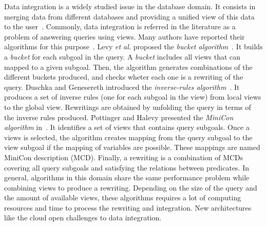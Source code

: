 \documentclass[11pt,a4paper,oneside]{report}
\begin{document}
Data integration is a widely studied issue in the database domain. It consists in merging data from different databases and providing a unified view of this data to the user~\cite{Lenzerini:2002}. Commonly, data integration is referred in the literature as a problem of answering queries using views. Many authors have reported their algorithms for this purpose~\cite{Halevy:2001}. Levy \textit{et al.} proposed the \textit{bucket algorithm}~\cite{Levy:1996}. It builds a \textit{bucket} for each subgoal in the query. A \textit{bucket} includes all views that can mapped to a given subgoal. Then, the algorithm generates combinations of the different buckets produced, and checks wheter each one is a rewriting of the query. Duschka and Genesereth introduced the \textit{inverse-rules algorithm}~\cite{Duschka:1997}. It produces a set of inverse rules (one for each subgoal in the view) from local views to the global view. Rewritings are obtained by unfolding the query in terms of the inverse rules produced. Pottinger and Halevy presented the \textit{MiniCon algorithm} in~\cite{Pottinger:2001}. It identifies a set of views that contains query subgoals. Once a views is selected, the algorithm creates mapping from the query subgoal to the view subgoal if the mapping of variables are possible. These mappings are named MiniCon description (MCD). Finally, a rewriting is a combination of MCDs covering all query subgoals and satisfying the relations between predicates. In general, algorithms in this domain share the same performance problem while combining views to produce a rewriting. Depending on the size of the query and the amount of available views, these algorithms requires a lot of computing resources and time to process the rewriting and integration. New architectures like the cloud open challenges to data integration.
\end{document}
